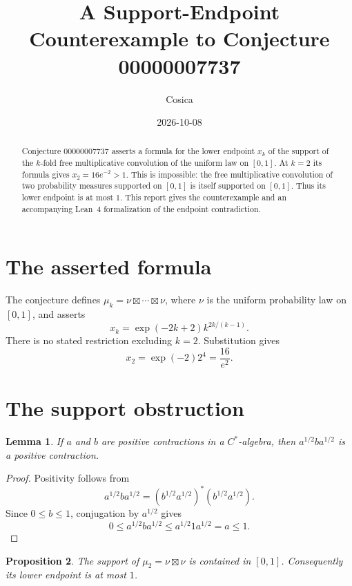 \documentclass[11pt]{article}
\title{A Support-Endpoint Counterexample to Conjecture 00000007737}
\author{Cosica}
\date{2026-10-08}
\newtheorem{proposition}{Proposition}
\newtheorem{lemma}[proposition]{Lemma}
\begin{document}
\maketitle

\begin{abstract}
Conjecture 00000007737 asserts a formula for the lower endpoint $x_k$ of the
support of the $k$-fold free multiplicative convolution of the uniform law on
$[0,1]$. At $k=2$ its formula gives $x_2=16e^{-2}>1$. This is impossible:
the free multiplicative convolution of two probability measures supported on
$[0,1]$ is itself supported on $[0,1]$. Thus its lower endpoint is at most
$1$. This report gives the counterexample and an accompanying Lean~4
formalization of the endpoint contradiction.
\end{abstract}

\section{The asserted formula}

The conjecture defines $\mu_k=\nu\boxtimes\cdots\boxtimes\nu$, where $\nu$
is the uniform probability law on $[0,1]$, and asserts
\[
  x_k=\exp(-2k+2) k^{2k/(k-1)}.
\]
There is no stated restriction excluding $k=2$. Substitution gives
\begin{equation}\label{eq:value}
  x_2=\exp(-2)2^4=\frac{16}{e^2}.
\end{equation}

\section{The support obstruction}

\begin{lemma}\label{lem:contraction}
If $a$ and $b$ are positive contractions in a $C^*$-algebra, then
$a^{1/2}ba^{1/2}$ is a positive contraction.
\end{lemma}

\begin{proof}
Positivity follows from
\[
  a^{1/2}ba^{1/2}=(b^{1/2}a^{1/2})^*(b^{1/2}a^{1/2}).
\]
Since $0\le b\le1$, conjugation by $a^{1/2}$ gives
\[
  0\le a^{1/2}ba^{1/2}\le a^{1/2}1a^{1/2}=a\le1.
\]
\end{proof}

\begin{proposition}\label{prop:support}
The support of $\mu_2=\nu\boxtimes\nu$ is contained in $[0,1]$.
Consequently its lower endpoint is at most $1$.
\end{proposition}
\end{document}
